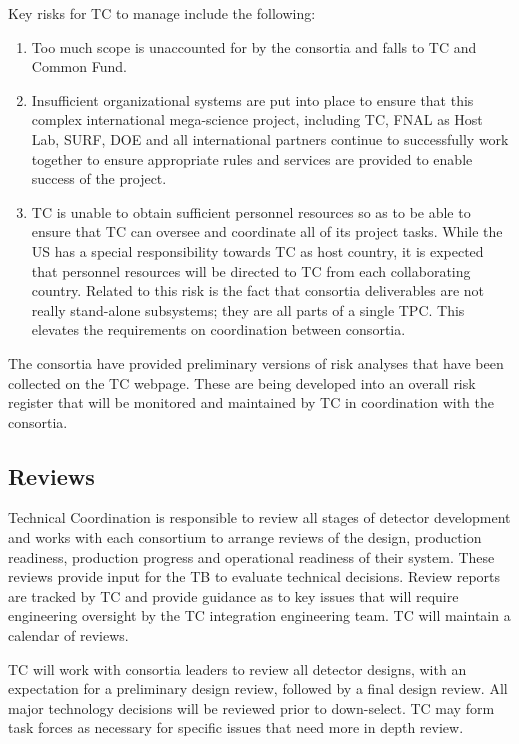 Key risks for TC to manage include the following:
\begin{enumerate}
    \item Too much scope is unaccounted for by the consortia and falls
      to TC and Common Fund.
    \item Insufficient organizational systems are put into place to
      ensure that this complex international mega-science project,
      including TC, FNAL as Host Lab, SURF, DOE and all international
      partners continue to successfully work together to ensure
      appropriate rules and services are provided to enable success of
      the project.
  \item TC is unable to obtain sufficient personnel resources so as to
    be able to ensure that TC can oversee and coordinate all of its
    project tasks.  While the US has a special responsibility towards
    TC as host country, it is expected that personnel resources will
    be directed to TC from each collaborating country. Related to this
    risk is the fact that consortia deliverables are not really
    stand-alone subsystems; they are all parts of a single TPC. This
    elevates the requirements on coordination between consortia.
\end{enumerate}

The consortia have provided preliminary versions of risk analyses that
have been collected on the TC webpage. These are being developed into
an overall risk register that will be monitored and maintained by TC
in coordination with the consortia.

\subsection{Reviews}
\label{sec:fdsp-coord-reviews}

Technical Coordination is responsible to review all stages of detector
development and works with each consortium to arrange reviews of the
design, production readiness, production progress and operational
readiness of their system.  These reviews provide input for the TB to
evaluate technical decisions.  Review reports are tracked by TC and
provide guidance as to key issues that will require engineering
oversight by the TC integration engineering team. TC will maintain a
calendar of  reviews.

TC will work with consortia leaders to review all detector designs,
with an expectation for a preliminary design review, followed by a
final design review. All major technology decisions will be reviewed
prior to down-select.  TC may form task forces as necessary for
specific issues that need more in depth review.


